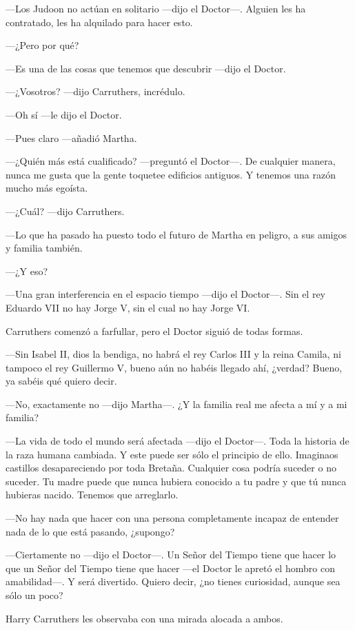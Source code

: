 ---Los Judoon no actúan en solitario ---dijo el Doctor---. Alguien les
ha contratado, les ha alquilado para hacer esto.

---¿Pero por qué?

---Es una de las cosas que tenemos que descubrir ---dijo el Doctor.

---¿Vosotros? ---dijo Carruthers, incrédulo.

---Oh sí ---le dijo el Doctor.

---Pues claro ---añadió Martha.

---¿Quién más está cualificado? ---preguntó el Doctor---. De cualquier
manera, nunca me gusta que la gente toquetee edificios antiguos. Y
tenemos una razón mucho más egoísta.

---¿Cuál? ---dijo Carruthers.

---Lo que ha pasado ha puesto todo el futuro de Martha en peligro, a sus
amigos y familia también.

---¿Y eso?

---Una gran interferencia en el espacio tiempo ---dijo el Doctor---. Sin
el rey Eduardo VII no hay Jorge V, sin el cual no hay Jorge VI.

Carruthers comenzó a farfullar, pero el Doctor siguió de todas formas.

---Sin Isabel II, dios la bendiga, no habrá el rey Carlos III y la reina
Camila, ni tampoco el rey Guillermo V, bueno aún no habéis llegado ahí,
¿verdad? Bueno, ya sabéis qué quiero decir.

---No, exactamente no ---dijo Martha---. ¿Y la familia real me afecta a
mí y a mi familia?

---La vida de todo el mundo será afectada ---dijo el Doctor---. Toda la
historia de la raza humana cambiada. Y este puede ser sólo el principio
de ello. Imaginaos castillos desapareciendo por toda Bretaña. Cualquier
cosa podría suceder o no suceder. Tu madre puede que nunca hubiera
conocido a tu padre y que tú nunca hubieras nacido. Tenemos que
arreglarlo.

---No hay nada que hacer con una persona completamente incapaz de
entender nada de lo que está pasando, ¿supongo?

---Ciertamente no ---dijo el Doctor---. Un Señor del Tiempo tiene que
hacer lo que un Señor del Tiempo tiene que hacer ---el Doctor le apretó
el hombro con amabilidad---. Y será divertido. Quiero decir, ¿no tienes
curiosidad, aunque sea sólo un poco?

Harry Carruthers les observaba con una mirada alocada a ambos.

